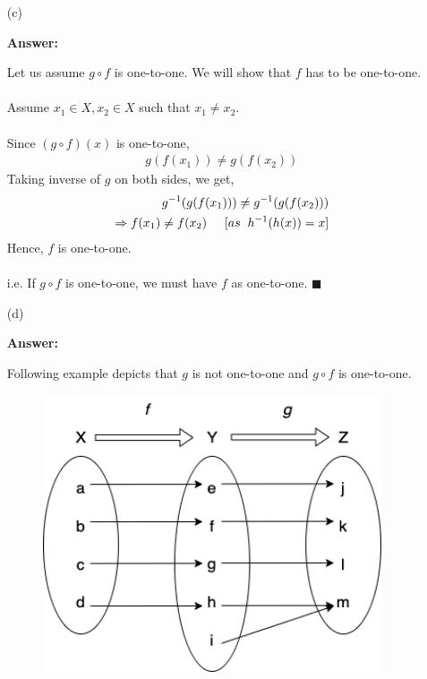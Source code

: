 \documentclass[14pt]{extreport}
\newcommand{\answer}[0]{\medskip \textbf{Answer:} \medskip}
\begin{document}
\begin{enumerate}

    \item[(c)]
    
        \answer

        Let us assume $g \circ f$ is one-to-one. We will show that $f$ has to be one-to-one. \\\\
        Assume $x_{1} \in X, x_{2} \in X$ such that $x_{1} \neq x_{2}$. \\\\
        Since $\left ( g \circ f \right )\left ( x \right )$ is one-to-one,
        \begin{align*}
            g(f(x_{1})) \neq g(f(x_{2}))
        \end{align*}
        Taking inverse of $g$ on both sides, we get,
        \begin{align*}
            g^{-1}(g(f(x_1))) \neq g^{-1}(g(f(x_2)))\\
            \Rightarrow f(x_1) \neq f(x_2) \hspace{5mm}[as \hspace{2mm} h^{-1}(h(x)) = x]
        \end{align*}
        Hence, $f$ is one-to-one. \\\\
        i.e. If $g \circ f$ is one-to-one, we must have $f$ as one-to-one. $\blacksquare$ 
        
    \item[(d)]
    
        \answer
        
        Following example depicts that $g$ is not one-to-one and $g \circ f$ is one-to-one. \\
        \begin{figure}[htp]
            \centering
            \includegraphics[width=10cm]{VennDiagramQ11.png}
            \label{fig:galaxy}
        \end{figure}
    
\end{enumerate}
\newpage
	
\end{document}
